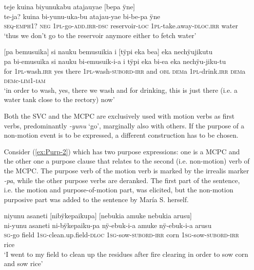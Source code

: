 \ea\label{ex:MCPC-neg-1}
\begingl
\glpreamble teje kuina biyunukabu atajauyae \textup{[}bepa ÿne\textup{]}\\
\gla te-ja? kuina bi-yunu-uka-bu atajau-yae bi-be-pa ÿne\\
\glb \textsc{seq}-\textsc{emph}1? \textsc{neg} 1\textsc{pl}-go-\textsc{add.irr}-\textsc{dsc} reservoir-\textsc{loc} 1\textsc{pl}-take.away-\textsc{dloc.irr} water\\
\glft ‘thus we don’t go to the reservoir anymore either to fetch water’
\endgl
\trailingcitation{[jxx-p120515l-2.218]}
\xe

\ea\label{ex:MCPC-follow}
\begingl
\glpreamble \textup{[}pa bemusuika\textup{]} si nauku bemusuikia i \textup{[}tÿpi eka bea\textup{]} eka nechÿujikutu \\
\gla pa bi-emusuika si nauku bi-emusuik-i-a i tÿpi eka bi-ea eka nechÿu-jiku-tu\\
\glb for 1\textsc{pl}-wash.\textsc{irr} yes there 1\textsc{pl}-wash-\textsc{subord}-\textsc{irr} and \textsc{obl} \textsc{dem}a 1\textsc{pl}-drink.\textsc{irr} \textsc{dem}a \textsc{dem}c-\textsc{lim}1-\textsc{iam}\\
\glft ‘in order to wash, yes, there we wash and for drinking, this is just there (i.e. a water tank close to the rectory) now’
\endgl
\trailingcitation{[jxx-p120515l-2.219-220]}
\xe
{}


Both the SVC and the MCPC are exclusively used with motion verbs as first verbs, predominantly \textit{-yunu} ‘go’, marginally also with others. If the purpose of a non-motion event is to be expressed, a different construction has to be chosen. 

Consider (\ref{ex:Purp-2}) which has two purpose expressions: one is a MCPC and the other one a purpose clause that relates to the second (i.e. non-motion) verb of the MCPC. The purpose verb of the motion verb is marked by the irrealis  marker \textit{-pa}, while the other purpose verbs are deranked. The first part of the sentence, i.e. the motion and purpose-of-motion part, was elicited, but the non-motion purposive part was added to the sentence by María S. herself.

\ea\label{ex:Purp-2}
\begingl
\glpreamble niyunu asaneti \textup{[}nibÿkepaikupa\textup{]} \textup{[}nebukia amuke nebukia arusu\textup{]}\\
\gla ni-yunu asaneti ni-bÿkepaiku-pa nÿ-ebuk-i-a amuke nÿ-ebuk-i-a arusu \\
\textsc{sg}-go field 1\textsc{sg}-clean.up.field-\textsc{dloc} 1\textsc{sg}-sow-\textsc{subord}-\textsc{irr} corn 1\textsc{sg}-sow-\textsc{subord}-\textsc{irr} rice\\
\glft ‘I went to my field to clean up the residues after fire clearing in order to sow corn and sow rice’
\endgl
\trailingcitation{[rxx-e181020le]}%
\xe

